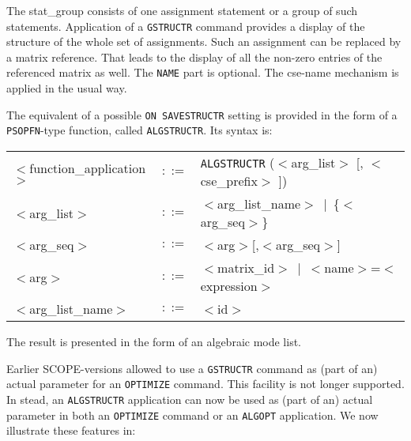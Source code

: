 The stat\_group consists
of one assignment statement or a group of such statements. Application of 
a {\tt GSTRUCTR} command provides a display of the structure of the whole 
set of assignments. Such an assignment can be replaced by a matrix reference.  
That leads to the display of all the non-zero entries of the referenced
matrix as well. The {\tt NAME} part is optional. The cse-name mechanism 
is applied in the usual way.

The equivalent of a possible {\tt ON SAVESTRUCTR} setting is provided in the
form of a {\tt PSOPFN}-type function, called {\tt ALGSTRUCTR}. 
Its syntax is:

\begin{center}
\begin{tabular}{lcl}
$<$function\_application$>$ & $::=$ & 
{\tt ALGSTRUCTR} ($<$arg\_list$>$ [, $<$cse\_prefix$>$ ]) \\
$<$arg\_list$>$ & $::=$ & $<$arg\_list\_name$>~\mid~$\{$<$arg\_seq$>$\}\\
$<$arg\_seq$>$ & $::=$ & $<$arg$>$[,$<$arg\_seq$>$]\\
$<$arg$>$ & $::=$ & $<$matrix\_id$>~\mid~<$name$>$=$<$expression$>$\\
$<$arg\_list\_name$>$ & $::=$ & $<$id$>$
\end{tabular}
\end{center}

The result is presented in the form of an algebraic mode list.

Earlier SCOPE-versions allowed to use a {\tt GSTRUCTR} command as (part of an)
actual parameter for an {\tt OPTIMIZE} command. This facility is not longer
supported. In stead, an {\tt ALGSTRUCTR} application can now be used as (part
of an) actual parameter in both an {\tt OPTIMIZE} command or an {\tt ALGOPT} 
application. We now illustrate these features in:

\example\label{ex:4.1.2}

